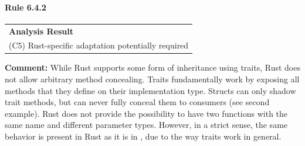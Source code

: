 \paragraph{Rule 6.4.2}
\begin{longtable}{p{13cm}}
\textbf{Analysis Result} \\
(C5) Rust-specific adaptation potentially required \\
\end{longtable}
\textbf{Comment:} While Rust supports some form of inheritance using traits, Rust does not allow arbitrary method concealing. Traits fundamentally work by exposing all methods that they define on their implementation type. Structs can only shadow trait methods, but can never fully conceal them to consumers (see second example). Rust does not provide the possibility to have two functions with the same name and different parameter types. However, in a strict sense, the same behavior is present in Rust as it is in \Cpp, due to the way traits work in general. \\



